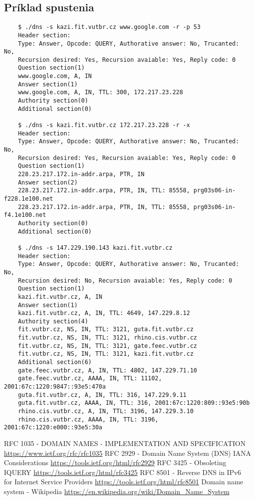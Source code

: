 \documentclass[titlepage]{article}
\begin{document}
\subsection{Príklad spustenia}
\begin{verbatim}
    $ ./dns -s kazi.fit.vutbr.cz www.google.com -r -p 53
    Header section:
    Type: Answer, Opcode: QUERY, Authorative answer: No, Trucanted: No, 
    Recursion desired: Yes, Recursion avaiable: Yes, Reply code: 0 
    Question section(1)
    www.google.com, A, IN 
    Answer section(1) 
    www.google.com, A, IN, TTL: 300, 172.217.23.228
    Authority section(0) 
    Additional section(0) 

    $ ./dns -s kazi.fit.vutbr.cz 172.217.23.228 -r -x
    Header section:
    Type: Answer, Opcode: QUERY, Authorative answer: No, Trucanted: No, 
    Recursion desired: Yes, Recursion avaiable: Yes, Reply code: 0 
    Question section(1)
    228.23.217.172.in-addr.arpa, PTR, IN 
    Answer section(2) 
    228.23.217.172.in-addr.arpa, PTR, IN, TTL: 85558, prg03s06-in-f228.1e100.net
    228.23.217.172.in-addr.arpa, PTR, IN, TTL: 85558, prg03s06-in-f4.1e100.net
    Authority section(0) 
    Additional section(0) 

    $ ./dns -s 147.229.190.143 kazi.fit.vutbr.cz
    Header section:
    Type: Answer, Opcode: QUERY, Authorative answer: No, Trucanted: No,
    Recursion desired: No, Recursion avaiable: Yes, Reply code: 0 
    Question section(1)
    kazi.fit.vutbr.cz, A, IN 
    Answer section(1) 
    kazi.fit.vutbr.cz, A, IN, TTL: 4649, 147.229.8.12
    Authority section(4) 
    fit.vutbr.cz, NS, IN, TTL: 3121, guta.fit.vutbr.cz
    fit.vutbr.cz, NS, IN, TTL: 3121, rhino.cis.vutbr.cz
    fit.vutbr.cz, NS, IN, TTL: 3121, gate.feec.vutbr.cz
    fit.vutbr.cz, NS, IN, TTL: 3121, kazi.fit.vutbr.cz
    Additional section(6) 
    gate.feec.vutbr.cz, A, IN, TTL: 4802, 147.229.71.10
    gate.feec.vutbr.cz, AAAA, IN, TTL: 11102, 2001:67c:1220:9847::93e5:470a
    guta.fit.vutbr.cz, A, IN, TTL: 316, 147.229.9.11
    guta.fit.vutbr.cz, AAAA, IN, TTL: 316, 2001:67c:1220:809::93e5:90b
    rhino.cis.vutbr.cz, A, IN, TTL: 3196, 147.229.3.10
    rhino.cis.vutbr.cz, AAAA, IN, TTL: 3196, 2001:67c:1220:e000::93e5:30a
\end{verbatim}


\newpage
\begin{thebibliography}{999}
    RFC 1035 - DOMAIN NAMES - IMPLEMENTATION AND SPECIFICATION
    \url{https://www.ietf.org/rfc/rfc1035}
    RFC 2929 - Domain Name System (DNS) IANA Considerations
    \url{https://tools.ietf.org/html/rfc2929}
    RFC 3425 - Obsoleting IQUERY
    \url{https://tools.ietf.org/html/rfc3425}
    RFC 8501 - Reverse DNS in IPv6 for Internet Service Providers
    \url{https://tools.ietf.org/html/rfc8501}
    Domain name system - Wikipedia
    \url{https://en.wikipedia.org/wiki/Domain_Name_System}
\end{thebibliography}
\end{document}
